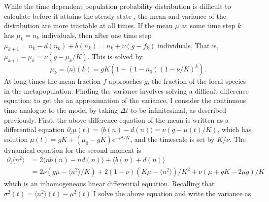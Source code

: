 While the time dependent population probability distribution is difficult to calculate before it attains the steady state \cite{McKane2003}, the mean and variance of the distribution are more tractable at all times. 
If the mean $\mu$ at some time step $k$ has $\mu_k=n_k$ individuals, then after one time step $\mu_{k+1}= n_k - d(n_k) + b(n_k) = n_k + \nu(g-f_k)$ individuals. 
That is, $\mu_{k+1}-\mu_k = \nu(g-\mu_k/K)$. 
This is solved by 
\begin{equation}
 \mu_k = \langle n\rangle(k) = g K \left( 1 - (1-n_0)(1-\nu/K)^k\right).
\end{equation}
At long times the mean fraction $f$ approaches $g$, the fraction of the focal species in the metapopulation. 
Finding the variance involves solving a difficult difference equation; to get the an approximation of the variance, I consider the continuous time analogue to the model by taking $\Delta t$ to be infinitesimal, as described previously. 
First, the above difference equation of the mean is written as a differential equation $\partial_t\mu(t) = \langle b(n)-d(n)\rangle = \nu\left(g-\mu(t)/K\right)$, which has solution $\mu(t) = g K + (\mu_0-g K)e^{-\nu t/K}$, and the timescale is set by $K/\nu$. %
The dynamical equation for the second moment is
\begin{align*}
 \partial_t\langle n^2\rangle &= 2\langle n b(n) - n d(n)\rangle + \langle b(n) + d(n)\rangle \\
                              &= 2\nu \left( g \mu - \langle n^2\rangle/K\right) + 2(1-\nu)\left(K\mu-\langle n^2\rangle\right)/K^2 + \nu(\mu + g K - 2 \mu g)/K
\end{align*}
which is an inhomogeneous linear differential equation. 
Recalling that $\sigma^2(t) = \langle n^2\rangle(t) - \mu^2(t)$ I solve the above equation and write the variance as
